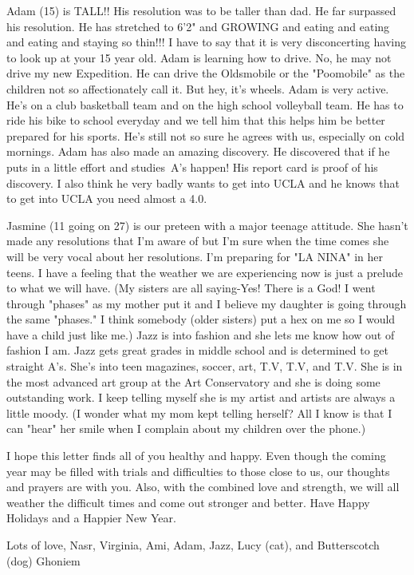 Adam (15) is TALL!! His resolution was to be taller than dad. He far surpassed his resolution. He has stretched to 6'2" and GROWING and eating
and eating and eating and staying so thin!!! I have to say that it is very disconcerting having to look up at your 15 year old. Adam is learning
how to drive. No, he may not drive my new Expedition. He can drive the Oldsmobile or the "Poomobile" as the children not so affectionately call
it. But hey, it's wheels. Adam is very active. He's on a club basketball team and on the high school volleyball team. He has to ride his bike to
school everyday and we tell him that this helps him be better prepared for his sports. He's still not so sure he agrees with us, especially on
cold mornings. Adam has also made an amazing discovery. He discovered that if he puts in a little effort and studies~A's happen! His report card
is proof of his discovery. I also think he very badly wants to get into UCLA and he knows that to get into UCLA you need almost a 4.0.

Jasmine (11 going on 27) is our preteen with a major teenage attitude. She hasn't made any resolutions that I'm aware of but I'm sure when the
time comes she will be very vocal about her resolutions. I'm preparing for "LA NINA" in her teens. I have a feeling that the weather we are
experiencing now is just a prelude to what we will have. (My sisters are all saying-Yes! There is a God! I went through "phases" as my mother
put it and I believe my daughter is going through the same "phases." I think somebody (older sisters) put a hex on me so I would have a child
just like me.) Jazz is into fashion and she lets me know how out of fashion I am. Jazz gets great grades in middle school and is determined to
get straight A's. She's into teen magazines, soccer, art, T.V, T.V, and T.V. She is in the most advanced art group at the Art Conservatory and
she is doing some outstanding work. I keep telling myself she is my artist and artists are always a little moody. (I wonder what my mom kept
telling herself? All I know is that I can "hear" her smile when I complain about my children over the phone.)

I hope this letter finds all of you healthy and happy. Even though the coming year may be filled with trials and difficulties to those close to
us, our thoughts and prayers are with you. Also, with the combined love and strength, we will all weather the difficult times and come out
stronger and better. Have Happy Holidays and a Happier New Year.

Lots of love, Nasr, Virginia, Ami, Adam, Jazz, Lucy (cat), and Butterscotch (dog) Ghoniem


%

